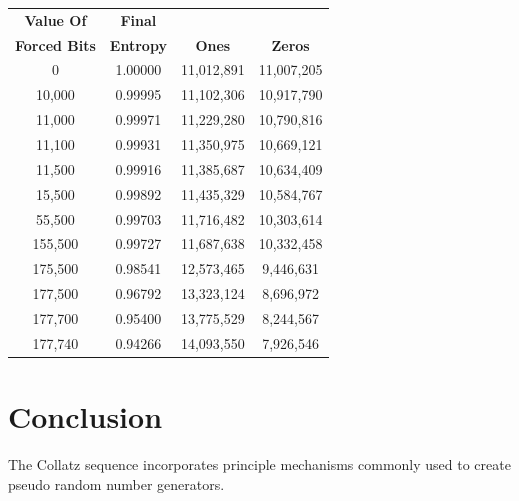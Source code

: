 \documentclass[letterpaper]{article}
\begin{document}
\begin{multicols}{2}
\begin{center}
\begin{tabular}{|c|c|c|c|}
\hline
\textbf{Value Of} & \textbf{Final} &&\\
\textbf{Forced Bits} & \textbf{Entropy} & \textbf{Ones} & \textbf{Zeros} \\
\hline
0 & 1.00000 & 11,012,891 & 11,007,205 \\
10,000 & 0.99995 & 11,102,306 & 10,917,790 \\
11,000 & 0.99971 & 11,229,280 & 10,790,816 \\
11,100 & 0.99931 & 11,350,975 & 10,669,121 \\
11,500 & 0.99916 & 11,385,687 & 10,634,409 \\
15,500 & 0.99892 & 11,435,329 & 10,584,767 \\
55,500 & 0.99703 & 11,716,482 & 10,303,614 \\
155,500 & 0.99727 & 11,687,638 & 10,332,458 \\
175,500 & 0.98541 & 12,573,465 & 9,446,631 \\
177,500 & 0.96792 & 13,323,124 & 8,696,972 \\
177,700 & 0.95400 & 13,775,529 & 8,244,567 \\
177,740 & 0.94266 & 14,093,550 & 7,926,546 \\
\hline
\end{tabular}
\end{center}

\section{Conclusion}

The Collatz sequence incorporates principle mechanisms commonly used to create pseudo random number generators.


\end{multicols}
\end{document}
